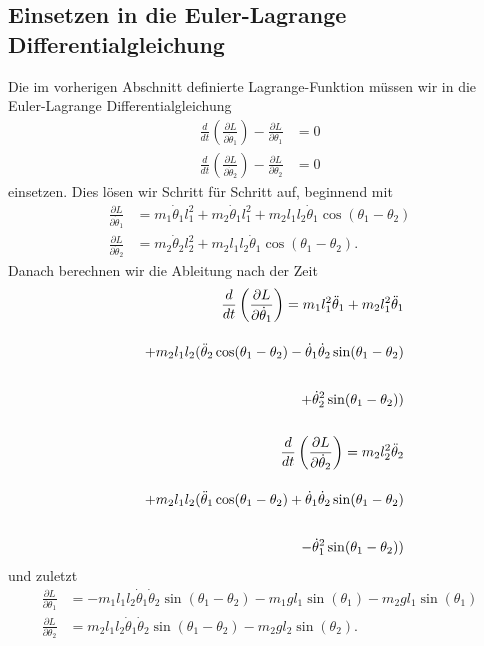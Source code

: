 \subsection{Einsetzen in die Euler-Lagrange Differentialgleichung}
Die im vorherigen Abschnitt definierte Lagrange-Funktion müssen wir in
die Euler-Lagrange Differentialgleichung
\begin{align}
    \label{eq:lag}
    \frac{d}{dt} \left(\frac{\partial L}{\partial \dot{\theta}_1}\right) 
    - \frac{\partial L}{\partial \theta_1} &= 0\\
    \frac{d}{dt} \left(\frac{\partial L}{\partial \dot{\theta}_2}\right) 
    - \frac{\partial L}{\partial \theta_2} &= 0
\end{align}
einsetzen.
Dies lösen wir Schritt für Schritt auf, beginnend mit
\begin{align}
    \frac{\partial L}{\partial \dot{\theta}_1} &= m_1 \dot{\theta}_1 l_1^2
    + m_2 \dot{\theta}_1 l_1^2 + m_2 l_1 l_2 \dot{\theta}_1
    \cos(\theta_1-\theta_2)\\
    \frac{\partial L}{\partial \dot{\theta}_2} &= m_2 \dot{\theta}_2 l_2^2
    + m_2 l_1 l_2 \dot{\theta}_1 \cos(\theta_1-\theta_2).
\end{align}
Danach berechnen wir die Ableitung nach der Zeit
\begin{align}
    \frac{d}{dt} \left(\frac{\partial L}{\partial \dot{\theta}_1}\right) =
    m_1 l_1^2 \ddot{\theta}_1 + m_2 l_1^2 \ddot{\theta}_1\\
    \shortintertext{}
    \qquad + m_2 l_1 l_2 (\ddot{\theta}_2\cos(\theta_1-\theta_2)-
    \dot{\theta}_1 \dot{\theta}_2 \sin(\theta_1-\theta_2) \nonumber\\
    \shortintertext{}
    \qquad + \dot{\theta}_2^2 \sin(\theta_1-\theta_2))
    \nonumber\\
    \shortintertext{}
    \frac{d}{dt} \left(\frac{\partial L}{\partial \dot{\theta}_2}\right) =
    m_2 l_2^2 \ddot{\theta}_2\\
    \shortintertext{}
    \qquad + m_2 l_1 l_2 (\ddot{\theta}_1\cos(\theta_1-\theta_2)+
    \dot{\theta}_1 \dot{\theta}_2 \sin(\theta_1-\theta_2) \nonumber\\
    \shortintertext{}
    \qquad - \dot{\theta}_1^2 \sin(\theta_1-\theta_2))
    \nonumber
\end{align}
und zuletzt
\begin{align}
    \frac{\partial L}{\partial {\theta}_1} &= -m_1 l_1 l_2 \dot{\theta}_1
    \dot{\theta}_2 \sin(\theta_1-\theta_2) - m_1 g l_1 \sin(\theta_1)
    - m_2 g l_1 \sin(\theta_1)\\
    \frac{\partial L}{\partial {\theta}_2} &= m_2 l_1 l_2 \dot{\theta}_1
    \dot{\theta}_2 \sin(\theta_1-\theta_2) - m_2 g l_2 \sin(\theta_2).
\end{align}
